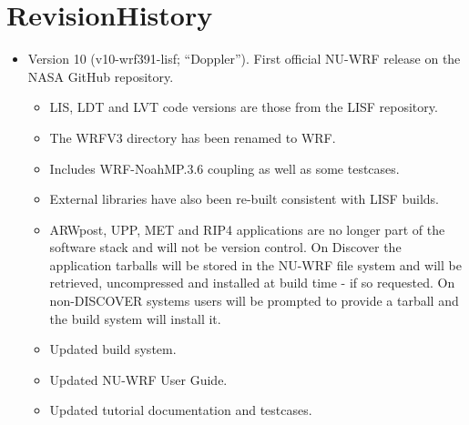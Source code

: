 \section{RevisionHistory}
\label{sec:revhist}

\begin{itemize}
\item Version 10 (v10-wrf391-lisf; ``Doppler''). First official NU-WRF release on the NASA GitHub repository.   \begin{itemize}
    \item  LIS, LDT and LVT code versions are those from the LISF repository.
    \item The WRFV3 directory has been renamed to WRF.
     \item Includes WRF-NoahMP.3.6 coupling as well as some testcases.
     \item External libraries have also been re-built consistent with LISF builds.
     \item ARWpost, UPP, MET and RIP4 applications are no longer part of the software
     stack and will not be version control. On Discover the application tarballs
     will be stored in the NU-WRF file system and will be retrieved, uncompressed
     and installed at build time - if so requested. On non-DISCOVER systems users
     will be prompted to provide a tarball and the build system will install it.
    \item Updated build system.
    \item Updated NU-WRF User Guide.
    \item Updated tutorial documentation and testcases.

  \end{itemize}

\end{itemize}


